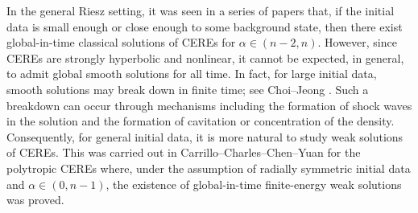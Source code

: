 \documentclass[reqno,11pt]{amsart}
\numberwithin{equation}{section}
\theoremstyle{definition}
\begin{document}
In the general Riesz setting, it was seen in a series of papers \cite{Chi_2025,Choi_2022_2,Choi_2025_2,Choi_2025,Danchin_2022} that, 
if the initial data is small enough or close enough to some background state, 
then there exist global-in-time classical solutions of CEREs for $\alpha \in (n-2,n)$. 
However, since CEREs are strongly hyperbolic and nonlinear, it cannot be expected, in general, 
to admit global smooth solutions for all time. 
In fact, for large initial data, smooth solutions may break down in finite time; see Choi–Jeong \cite{Choi_2022}. 
Such a breakdown can occur through mechanisms including the formation of shock waves in the solution 
and the formation of cavitation or concentration of the density. 
Consequently, for general initial data, it is more natural to study weak solutions of CEREs. 
This was carried out in Carrillo–Charles–Chen–Yuan \cite{Carrillo2025} for the polytropic CEREs 
where, under the assumption of radially symmetric initial data and $\alpha \in (0,n-1)$, 
the existence of global-in-time finite-energy weak solutions was proved.
\end{document}
